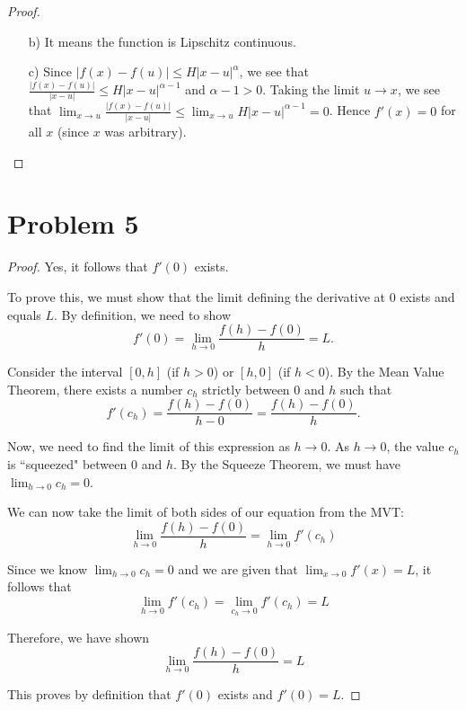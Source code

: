\documentclass[11pt]{article}
\renewcommand{\_}[1]{\underline{ #1 }}
\theoremstyle{definition}
\numberwithin{equation}{subsection}
\begin{document}
\begin{proof}
\begin{enumerate}
\item [b)] It means the function is Lipschitz continuous.

\item [c)] Since $|f(x)-f(u)|\leq H|x-u|^\alpha$, we see that $\frac{|f(x)-f(u)|}{|x-u|} \leq H |x-u|^{\alpha-1}$ and $\alpha-1>0$. Taking the limit $u
\to x$, we see that $\displaystyle \lim_{x\to u} \frac{|f(x)-f(u)|}{|x-u|} \leq \displaystyle \lim_{x\to u} H |x-u|^{\alpha-1}=0$. Hence $f'(x)=0$ for all $x$ (since $x$ was arbitrary).
    
\end{enumerate}
\end{proof}

\bigskip

\section*{Problem 5}
\begin{proof}
Yes, it follows that $f'(0)$ exists.

To prove this, we must show that the limit defining the derivative at 0 exists and equals $L$. By definition, we need to show
$$f'(0) = \lim_{h \to 0} \frac{f(h) - f(0)}{h} = L.$$

Consider the interval $[0, h]$ (if $h > 0$) or $[h, 0]$ (if $h < 0$). By the Mean Value Theorem, there exists a number $c_h$ strictly between $0$ and $h$ such that
$$f'(c_h) = \frac{f(h) - f(0)}{h - 0} = \frac{f(h) - f(0)}{h}.$$

Now, we need to find the limit of this expression as $h \to 0$.
As $h \to 0$, the value $c_h$ is   ``squeezed" between $0$ and $h$. By the Squeeze Theorem, we must have $\lim_{h \to 0} c_h = 0$.

We can now take the limit of both sides of our equation from the MVT:
$$\lim_{h \to 0} \frac{f(h) - f(0)}{h} = \lim_{h \to 0} f'(c_h)$$

Since we know $\lim_{h \to 0} c_h = 0$ and we are given that $\lim_{x \to 0} f'(x) = L$, it follows that
$$\lim_{h \to 0} f'(c_h) = \lim_{c_h \to 0} f'(c_h) = L$$

Therefore, we have shown
$$\lim_{h \to 0} \frac{f(h) - f(0)}{h} = L$$

This proves by definition that $f'(0)$ exists and $f'(0) = L$.

\end{proof}

\bigskip
\end{document}
